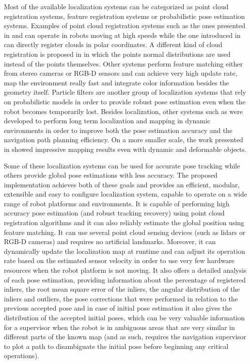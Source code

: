 Most of the available localization systems can be categorized as point cloud registration systems, feature registration systems or probabilistic pose estimation systems. Examples of point cloud registration systems such as the ones presented in \cite{Lingemann2005} and \cite{Pomerleau2013} can operate in robots moving at high speeds while the one introduced in \cite{Diosi2005} can directly register clouds in polar coordinates. A different kind of cloud registration is proposed in \cite{Magnusson2009} in which the points normal distributions are used instead of the points themselves. Other systems perform feature matching either from stereo cameras \cite{Kitt2010} or RGB-D sensors \cite{Labb2014} and can achieve very high update rate, map the environment really fast and integrate color information besides the geometry itself. Particle filters \cite{Fox2003,Thrun2002} are another group of localization systems that rely on probabilistic models in order to provide robust pose estimation even when the robot becomes temporarily lost. Besides localization, other systems such as \cite{Grisetti2007,Kaess2008,Tipaldi2013,Kerl,Stuckler2012} were developed to perform long term localization and mapping in dynamic environments in order to improve both the pose estimation accuracy and the navigation path planning efficiency. On a more smaller scale, the work presented in \cite{Newcombe} showed impressive mapping results even with dynamic and deformable objects.

Some of these localization systems can be used for accurate pose tracking while others provide global pose estimations with less accuracy. The proposed implementation achieves both of these goals and provides an efficient, modular, extensible and easy to configure localization system, capable to operate on a wide range of robot platforms and environments. It is capable of performing high accuracy pose estimation (and robust tracking recovery) using point cloud registration algorithms and it can also reliably estimate the global position using feature matching. It can use several point cloud sensing devices (such as \glspl{lidar} or RGB-D cameras) and requires no artificial landmarks. Moreover, it can dynamically update the localization map at runtime and can adjust its operation rate based on the estimated sensor velocity in order to use very few hardware resources when the robot platform is not moving. It also offers a detailed analysis of each pose estimation, providing information about the percentage of registered inliers, the root mean square error of the inliers, the angular distribution of the inliers and outliers, the pose corrections that were performed in relation to the previous accepted pose and in case of initial pose estimation it also gives the distribution of the accepted initial poses, which can be very valuable information for a supervisor when the robot is in ambiguous areas that are very similar in different parts of the known map (and as such, requires the navigation supervisor to plot a path to disambiguate the initial pose before beginning any critical operations).

